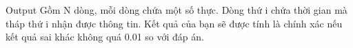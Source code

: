 Output
Gồm N dòng, mỗi dòng chứa một số thực. Dòng thứ i chứa thời gian mà tháp thứ i nhận được thông tin. Kết quả của bạn sẽ được tính là chính xác nếu kết quả sai khác không quá 0.01 so với đáp án.